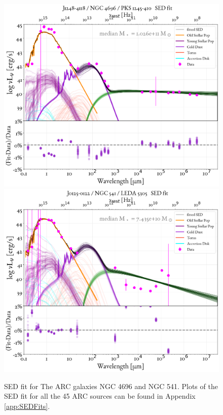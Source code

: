 \begin{figure}
    \centering
    \includegraphics[width=0.75\linewidth]{figures/ResultFits/51_SEDfit_4126.png}\\
    \includegraphics[width=0.75\linewidth]{figures/ResultFits/93_SEDfit_5260.png}
    \caption{SED fit for The ARC galaxies NGC 4696 and NGC 541. Plots of the SED fit for all the 45 ARC sources can be found in Appendix \ref{app:SEDFits}. }
  \label{fig:SEDfit2}
\end{figure}